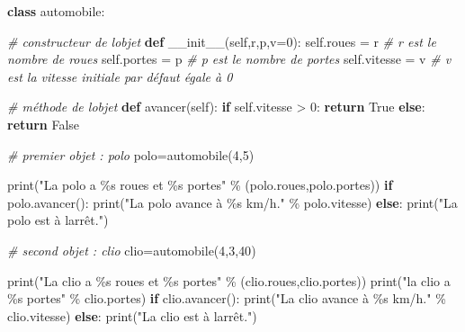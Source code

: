 \documentclass[11pt]{article}
\newenvironment{Shaded}{}{}
\newcommand{\KeywordTok}[1]{\textcolor[rgb]{0.00,0.44,0.13}{\textbf{{#1}}}}
\newcommand{\DecValTok}[1]{\textcolor[rgb]{0.25,0.63,0.44}{{#1}}}
\newcommand{\StringTok}[1]{\textcolor[rgb]{0.25,0.44,0.63}{{#1}}}
\newcommand{\CommentTok}[1]{\textcolor[rgb]{0.38,0.63,0.69}{\textit{{#1}}}}
\newcommand{\FunctionTok}[1]{\textcolor[rgb]{0.02,0.16,0.49}{{#1}}}
\newcommand{\NormalTok}[1]{{#1}}
\newcommand{\SpecialCharTok}[1]{\textcolor[rgb]{0.25,0.44,0.63}{{#1}}}
\newcommand{\VariableTok}[1]{\textcolor[rgb]{0.10,0.09,0.49}{{#1}}}
\newcommand{\ControlFlowTok}[1]{\textcolor[rgb]{0.00,0.44,0.13}{\textbf{{#1}}}}
\newcommand{\OperatorTok}[1]{\textcolor[rgb]{0.40,0.40,0.40}{{#1}}}
\newcommand{\BuiltInTok}[1]{{#1}}
\begin{document}
\begin{Shaded}
\begin{Highlighting}[]
\KeywordTok{class}\NormalTok{ automobile:}
    
    \CommentTok{\# constructeur de l\textquotesingle{}objet}
    \KeywordTok{def} \FunctionTok{\_\_init\_\_}\NormalTok{(}\VariableTok{self}\NormalTok{,r,p,v}\OperatorTok{=}\DecValTok{0}\NormalTok{):}
        \VariableTok{self}\NormalTok{.roues }\OperatorTok{=}\NormalTok{ r }\CommentTok{\# r est le nombre de roues}
        \VariableTok{self}\NormalTok{.portes }\OperatorTok{=}\NormalTok{ p }\CommentTok{\# p est le nombre de portes}
        \VariableTok{self}\NormalTok{.vitesse }\OperatorTok{=}\NormalTok{ v }\CommentTok{\# v est la vitesse initiale par défaut égale à 0}
    
    \CommentTok{\# méthode de l\textquotesingle{}objet}
    \KeywordTok{def}\NormalTok{ avancer(}\VariableTok{self}\NormalTok{):}
        \ControlFlowTok{if} \VariableTok{self}\NormalTok{.vitesse }\OperatorTok{\textgreater{}} \DecValTok{0}\NormalTok{:}
            \ControlFlowTok{return} \VariableTok{True}
        \ControlFlowTok{else}\NormalTok{:}
            \ControlFlowTok{return} \VariableTok{False}

\CommentTok{\# premier objet : polo}
\NormalTok{polo}\OperatorTok{=}\NormalTok{automobile(}\DecValTok{4}\NormalTok{,}\DecValTok{5}\NormalTok{)}

\BuiltInTok{print}\NormalTok{(}\StringTok{"La polo a }\SpecialCharTok{\%s}\StringTok{ roues et }\SpecialCharTok{\%s}\StringTok{ portes"} \OperatorTok{\%}\NormalTok{ (polo.roues,polo.portes))}
\ControlFlowTok{if}\NormalTok{ polo.avancer():}
    \BuiltInTok{print}\NormalTok{(}\StringTok{"La polo avance à }\SpecialCharTok{\%s}\StringTok{ km/h."} \OperatorTok{\%}\NormalTok{ polo.vitesse)}
\ControlFlowTok{else}\NormalTok{:}
    \BuiltInTok{print}\NormalTok{(}\StringTok{"La polo est à l\textquotesingle{}arrêt."}\NormalTok{)}


\CommentTok{\# second objet : clio}
\NormalTok{clio}\OperatorTok{=}\NormalTok{automobile(}\DecValTok{4}\NormalTok{,}\DecValTok{3}\NormalTok{,}\DecValTok{40}\NormalTok{)}

\BuiltInTok{print}\NormalTok{(}\StringTok{"La clio a }\SpecialCharTok{\%s}\StringTok{ roues et }\SpecialCharTok{\%s}\StringTok{ portes"} \OperatorTok{\%}\NormalTok{ (clio.roues,clio.portes))}
\BuiltInTok{print}\NormalTok{(}\StringTok{"la clio a }\SpecialCharTok{\%s}\StringTok{ portes"} \OperatorTok{\%}\NormalTok{ clio.portes)}
\ControlFlowTok{if}\NormalTok{ clio.avancer():}
    \BuiltInTok{print}\NormalTok{(}\StringTok{"La clio avance à }\SpecialCharTok{\%s}\StringTok{ km/h."} \OperatorTok{\%}\NormalTok{ clio.vitesse)}
\ControlFlowTok{else}\NormalTok{:}
    \BuiltInTok{print}\NormalTok{(}\StringTok{"La clio est à l\textquotesingle{}arrêt."}\NormalTok{)}
\end{Highlighting}
\end{Shaded}
\end{document}
